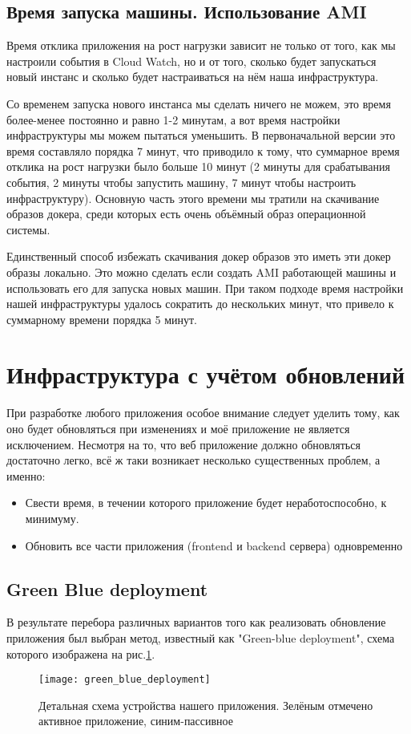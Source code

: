 \subsection{Время запуска машины. Использование AMI}
	Время отклика приложения на рост нагрузки зависит не только от того, как мы настроили события в Cloud Watch, но и от того, сколько будет запускаться новый инстанс и сколько будет настраиваться на нём наша инфраструктура. 
	
	Со временем запуска нового инстанса мы сделать ничего не можем, это время более-менее постоянно и равно 1-2 минутам, а вот время настройки инфраструктуры мы можем пытаться уменьшить. В первоначальной версии это время составляло порядка 7 минут, что приводило к тому, что суммарное время отклика на рост нагрузки было больше 10 минут (2 минуты для срабатывания события, 2 минуты чтобы запустить машину, 7 минут чтобы настроить инфраструктуру). Основную часть этого времени мы тратили на скачивание образов докера, среди которых есть очень объёмный образ операционной системы.
	
	Единственный способ избежать скачивания докер образов это иметь эти докер образы локально. Это можно сделать если создать AMI работающей машины и использовать его для запуска новых машин. При таком подходе время настройки нашей инфраструктуры удалось сократить до нескольких минут, что привело к суммарному времени порядка 5 минут. 
\section{Инфраструктура с учётом обновлений}
При разработке любого приложения особое внимание следует уделить тому, как оно будет обновляться при изменениях и моё приложение не является исключением. Несмотря на то, что веб приложение должно обновляться достаточно легко, всё ж таки возникает несколько существенных проблем, а именно:
\begin{itemize}
	\item Свести время, в течении которого приложение будет неработоспособно, к минимуму.
	\item Обновить все части приложения (frontend и backend сервера) одновременно
\end{itemize}
\subsection{Green Blue deployment}
В результате перебора различных вариантов того как реализовать обновление приложения был выбран метод, известный как "Green-blue deployment", схема которого изображена на рис.\ref{fig:green_blue_deployment}.
\begin{figure}[h]
    \centering
    \texttt{[image: green\_blue\_deployment]} 
    \caption{Детальная схема устройства нашего приложения. Зелёным отмечено активное приложение, синим-пассивное}
    \label{fig:green_blue_deployment}
\end{figure}

